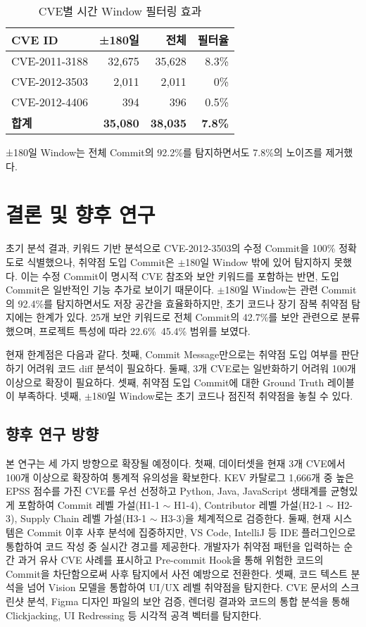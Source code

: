 ﻿\documentclass[conference]{IEEEtran}
\begin{document}
\begin{table}[h]
\centering
\caption{CVE별 시간 Window 필터링 효과}
\label{tab:time_window_effect}
\begin{tabular}{lrrr}
\toprule
\textbf{CVE ID} & \textbf{±180일} & \textbf{전체} & \textbf{필터율} \\
\midrule
CVE-2011-3188 & 32,675 & 35,628 & 8.3\% \\
CVE-2012-3503 & 2,011 & 2,011 & 0\% \\
CVE-2012-4406 & 394 & 396 & 0.5\% \\
\midrule
\textbf{합계} & \textbf{35,080} & \textbf{38,035} & \textbf{7.8\%} \\
\bottomrule
\end{tabular}
\end{table}

±180일 Window는 전체 Commit의 92.2\%를 탐지하면서도 7.8\%의 노이즈를 제거했다.


\section{결론 및 향후 연구}

초기 분석 결과, 키워드 기반 분석으로 CVE-2012-3503의 수정 Commit을 100\% 정확도로 식별했으나, 취약점 도입 Commit은 $\pm$180일 Window 밖에 있어 탐지하지 못했다. 이는 수정 Commit이 명시적 CVE 참조와 보안 키워드를 포함하는 반면, 도입 Commit은 일반적인 기능 추가로 보이기 때문이다. $\pm$180일 Window는 관련 Commit의 92.4\%를 탐지하면서도 저장 공간을 효율화하지만, 초기 코드나 장기 잠복 취약점 탐지에는 한계가 있다. 25개 보안 키워드로 전체 Commit의 42.7\%를 보안 관련으로 분류했으며, 프로젝트 특성에 따라 22.6\%~45.4\% 범위를 보였다.

현재 한계점은 다음과 같다. 첫째, Commit Message만으로는 취약점 도입 여부를 판단하기 어려워 코드 diff 분석이 필요하다. 둘째, 3개 CVE로는 일반화하기 어려워 100개 이상으로 확장이 필요하다. 셋째, 취약점 도입 Commit에 대한 Ground Truth 레이블이 부족하다. 넷째, $\pm$180일 Window로는 초기 코드나 점진적 취약점을 놓칠 수 있다.

\subsection{향후 연구 방향}

본 연구는 세 가지 방향으로 확장될 예정이다. 첫째, 데이터셋을 현재 3개 CVE에서 100개 이상으로 확장하여 통계적 유의성을 확보한다. KEV 카탈로그 1,666개 중 높은 EPSS 점수를 가진 CVE를 우선 선정하고 Python, Java, JavaScript 생태계를 균형있게 포함하여 Commit 레벨 가설(H1-1 $\sim$ H1-4), Contributor 레벨 가설(H2-1 $\sim$ H2-3), Supply Chain 레벨 가설(H3-1 $\sim$ H3-3)을 체계적으로 검증한다. 둘째, 현재 시스템은 Commit 이후 사후 분석에 집중하지만, VS Code, IntelliJ 등 IDE 플러그인으로 통합하여 코드 작성 중 실시간 경고를 제공한다. 개발자가 취약점 패턴을 입력하는 순간 과거 유사 CVE 사례를 표시하고 Pre-commit Hook을 통해 위험한 코드의 Commit을 차단함으로써 사후 탐지에서 사전 예방으로 전환한다. 셋째, 코드 텍스트 분석을 넘어 Vision 모델을 통합하여 UI/UX 레벨 취약점을 탐지한다. CVE 문서의 스크린샷 분석, Figma 디자인 파일의 보안 검증, 렌더링 결과와 코드의 통합 분석을 통해 Clickjacking, UI Redressing 등 시각적 공격 벡터를 탐지한다.
\end{document}
